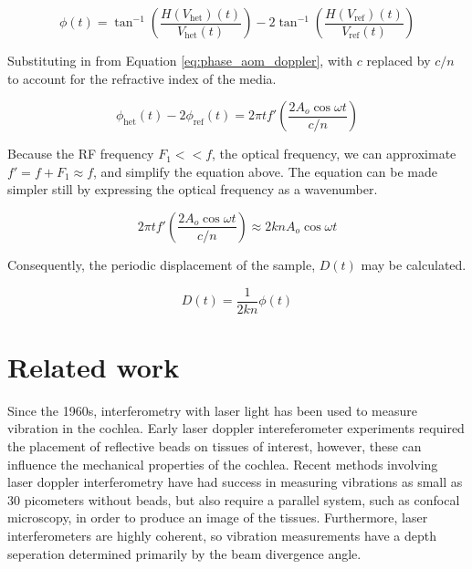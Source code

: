 \begin{equation}
\phi(t) = \tan^{-1}\left( \frac{H(V_{\mathrm{het}})(t)}{V_{\mathrm{het}}(t)} \right) - 2\tan^{-1}\left( \frac{H(V_{\mathrm{ref}})(t)}{V_{\mathrm{ref}}(t)} \right)
\end{equation}

Substituting in from Equation \ref{eq:phase_aom_doppler}, with $c$ replaced by $c/n$ to account for the refractive index of the media.

\begin{equation}
\phi_{\mathrm{het}}(t) - 2 \phi_{\mathrm{ref}}(t) = 2 \pi t f'  \left( \frac{2 A_o \cos{\omega t}}{c/n} \right)
\end{equation}

Because the RF frequency $F_1 << f$, the optical frequency, we can approximate $f' = f + F_1 \approx f$, and simplify the equation above. The equation can be made simpler still by expressing the optical frequency as a wavenumber.

\begin{equation}
2 \pi t f'  \left( \frac{2 A_o \cos{\omega t}}{c/n} \right) \approx 2 k n A_o \cos{\omega t}
\end{equation}

Consequently, the periodic displacement of the sample, $D(t)$ may be calculated.


\begin{equation}
D(t) = \frac{1}{2kn} \phi(t)
\end{equation}

\section{Related work}

Since the 1960s, interferometry with laser light has been used to measure vibration in the cochlea. Early laser doppler intereferometer experiments required the placement of reflective beads on tissues of interest, however, these can influence the mechanical properties of the cochlea. \cite{Nuttall2012} Recent methods involving laser doppler interferometry have had success in measuring vibrations as small as 30 picometers without beads, but also require a parallel system, such as confocal microscopy, in order to produce an image of the tissues. Furthermore, laser interferometers are highly coherent, so vibration measurements have a depth seperation determined primarily by the beam divergence angle. \cite{Jacob2009} \cite{Ren2002} \cite{Ren2011} 

